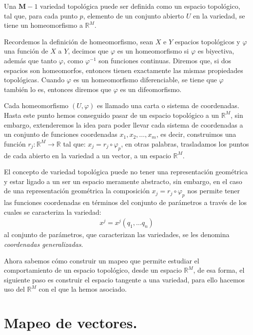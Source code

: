 \documentclass[12pt]{article}
\begin{document}
Una $\mathbf{M}-1$ variedad topológica puede ser definida como un espacio topológico, tal que, para cada punto $p$, elemento de un conjunto abierto $U$ en la variedad, se tiene un homeomorfismo a $\mathbb{R}^{M}$.
\par
Recordemos la definición de homeomorfismo, sean $X$ e $Y$ espacios topológicos y $\varphi$ una función de $X$ a $Y$, decimos que $\varphi$ es un homeomorfismo si $\varphi$ es biyectiva, además que tanto $\varphi$, como $\varphi^{-1}$ son funciones continuas. Diremos que, si dos espacios son homeomorfos, entonces tienen exactamente las mismas propiedades topológicas. Cuando $\varphi$ es un homeomorfismo diferenciable, se tiene que $\varphi$ también lo es, entonces diremos que $\varphi$ es un difeomorfismo.
\par
Cada homeomorfismo $(U, \varphi)$ es llamado una carta o sistema de coordenadas. Hasta este punto hemos conseguido pasar de un espacio topológico a un $\mathbb{R}^{M}$, sin embargo, extenderemos la idea para poder llevar cada sistema de coordenadas a un conjunto de funciones coordenadas $x_{1}, x_{2}, \ldots, x_{m}$, es decir, construimos una función $r_{j} : \mathbb{R}^{M} \rightarrow \mathbb{R}$ tal que: $x_{j} = r_{j} \circ \varphi_{p}$, en otras palabras, trasladamos los puntos de cada abierto en la variedad a un vector, a un espacio $\mathbb{R}^{M}$.
\par
El concepto de variedad topológica puede no tener una representación geométrica y estar ligado a un ser un espacio meramente abstracto, sin embargo, en el caso de una representación geométrica la composición $x_{j} = r_{j} \circ \varphi_{p}$ nos permite tener las funciones coordenadas en términos del conjunto de parámetros a través de los cuales se caracteriza la variedad:
\begin{align}
x^{j} = x^{j} (q_{1}, \ldots q_{n})
\label{eq:ecuacion_01_01}
\end{align}
al conjunto de parámetros, que caracterizan las variedades, se les denomina \emph{coordenadas generalizadas}.
\par
Ahora sabemos cómo construir un mapeo que permite estudiar el comportamiento de un espacio topológico, desde un espacio $\mathbb{R}^{M}$, de esa forma, el siguiente paso es construir el espacio tangente a una variedad, para ello hacemos uso del $\mathbb{R}^{M}$ con el que la hemos asociado.
\section{Mapeo de vectores.}
\end{document}
